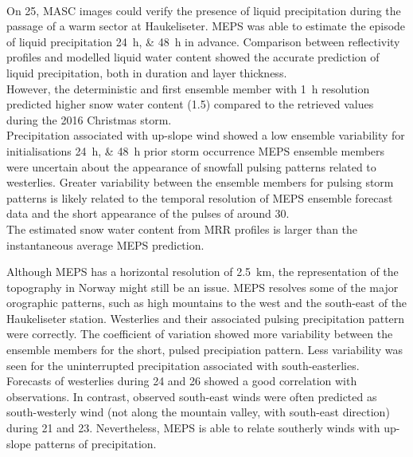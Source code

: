 \\
On \SI{25}{\dec}, MASC images could verify the presence of liquid precipitation during the passage of a warm sector at Haukeliseter. MEPS was able to estimate the episode of liquid precipitation \SIlist{24;48}{\hour} in advance. %
Comparison between reflectivity profiles and modelled liquid water content showed the accurate prediction of liquid precipitation, both in duration and layer thickness. %
\\
However, the deterministic and first ensemble member with \SI{1}{\hour} resolution predicted higher snow water content (\SI{1.5}{\SWC}) compared to the retrieved values %
during the 2016 Christmas storm.
\\
Precipitation associated with up-slope wind showed a low ensemble variability for initialisations \SIlist{24;48}{\hour} prior storm occurrence %
MEPS ensemble members were uncertain about the appearance of snowfall pulsing patterns related to westerlies. Greater variability between the ensemble members for pulsing storm patterns is likely related to the temporal resolution of MEPS ensemble forecast data and the short appearance of the pulses of around \SI{30}{\min}.
\\
The estimated snow water content from MRR profiles is larger than the instantaneous average MEPS prediction. %
\\
\par\medskip
\noindent
Although MEPS has a horizontal resolution of \SI{2.5}{\km}, the representation of the %
topography in Norway might still be an issue. MEPS %
resolves some of the major orographic patterns, such as high mountains to the west and the south-east of the Haukeliseter station. Westerlies and their associated pulsing precipitation pattern were correctly.%
The coefficient of variation showed more variability between the ensemble members for the short, pulsed precipiation pattern. Less variability was seen for the uninterrupted precipitation associated with south-easterlies.
Forecasts of westerlies during \num{24} and \SI{26}{\dec} showed a good correlation with observations. In contrast, observed south-east winds were often predicted as south-westerly wind (not along the mountain valley, with south-east direction) during \num{21} and \SI{23}{\dec}. Nevertheless, MEPS is able to relate southerly winds with up-slope patterns of precipitation.
